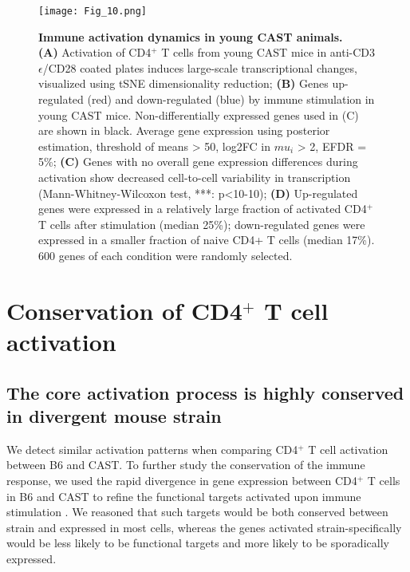 \begin{figure}[!ht]
\centering
\texttt{[image: Fig\_10.png]}
\caption[Immune activation dynamics in young CAST animals]{\textbf{Immune activation dynamics in young CAST animals.}\\
\textbf{(A)} Activation of CD4$^+$ T cells from young CAST mice in anti-CD3$\epsilon$/CD28 coated plates induces large-scale transcriptional changes, visualized using tSNE dimensionality reduction; \textbf{(B)} Genes up-regulated (red) and down-regulated (blue) by immune stimulation in young CAST mice. Non-differentially expressed genes used in (C) are shown  in black. Average gene expression using posterior estimation, threshold of means > 50, log2FC in $mu_i$ > 2, EFDR = 5\%; \textbf{(C)} Genes with no overall gene expression differences during activation show decreased cell-to-cell variability in transcription (Mann-Whitney-Wilcoxon test, ***: p<10-10); \textbf{(D)} Up-regulated genes were expressed in a relatively large fraction of activated CD4$^+$ T cells after stimulation (median 25\%); down-regulated genes were expressed in a smaller fraction of naive CD4+ T cells (median 17\%). 600 genes of each condition were randomly selected.
}
\label{fig1:immune_activation_CAST}
\end{figure}

\newpage

\section{Conservation of CD4$^+$ T cell activation}
\subsection*{The core activation process is highly conserved in divergent mouse strain}

We detect similar activation patterns when comparing CD4$^+$ T cell activation between B6 and CAST. To further study the conservation of the immune response, we used the rapid divergence in gene expression between CD4$^+$ T cells in B6 and CAST to refine the functional targets activated upon immune stimulation \citep{Shay2013}. We reasoned that such targets would be both conserved between strain and expressed in most cells, whereas the genes activated strain-specifically would be less likely to be functional targets and more likely to be sporadically expressed.\\

